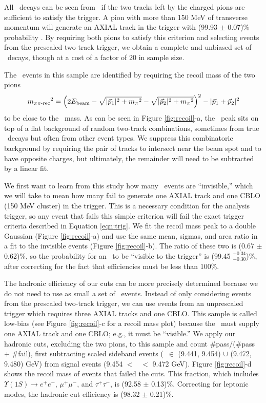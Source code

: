 \documentclass[aps,prd,preprint,superscriptaddress,tightenlines,nofootinbib,floatfix]{revtex4}
\begin{document}
All \uone\ decays can be seen from \twotoone\ if the two tracks left
by the charged pions are sufficient to satisfy the trigger.  A pion
with more than 150 MeV of transverse momentum will generate an AXIAL
track in the trigger with (99.93 $\pm$ 0.07)\% probability
\cite{inga}.  By requiring both pions to satisfy this criterion and
selecting events from the prescaled two-track trigger, we obtain a
complete and unbiased set of \uone\ decays, though at a cost of a
factor of 20 in sample size.

The \twotoone\ events in this sample are identified by requiring the
recoil mass of the two pions
\begin{equation}
  {m_{\mbox{\scriptsize $\pi\pi$-rec}}}^2 = \left(2 E_{\mbox{\scriptsize beam}} - \sqrt{|\vec{p}_1|^2 + {m_\pi}^2}
  - \sqrt{|\vec{p}_2|^2 + {m_\pi}^2}\right)^2 - |\vec{p}_1 + \vec{p}_2|^2
\end{equation}
to be close to the \uone\ mass.  As can be seen in Figure
\ref{fig:recoil}-a, the \uone\ peak sits on top of a flat background
of random two-track combinations, sometimes from true \twotoone\
decays but often from other event types.  We suppress this
combinatoric background by requiring the pair of tracks to intersect
near the beam spot and to have opposite charges, but ultimately, the
remainder will need to be subtracted by a linear fit.

We first want to learn from this study how many \uone\ events are
``invisible,'' which we will take to mean how many fail to generate
one AXIAL track and one CBLO (150 MeV cluster) in the trigger.  This
is a necessary condition for the analysis trigger, so any event that
fails this simple criterion will fail the exact trigger criteria
described in Equation \ref{eqn:trig}.  We fit the recoil mass peak to
a double Gaussian (Figure \ref{fig:recoil}-a) and use the same mean,
sigmas, and area ratio in a fit to the invisible events (Figure
\ref{fig:recoil}-b).  The ratio of these two is (0.67 $\pm$ 0.62)\%,
so the probability for an \uone\ to be ``visible to the trigger'' is
(99.45 $^{+0.34}_{-0.30}$)\%, after correcting for the fact that
efficiencies must be less than 100\%.

The hadronic efficiency of our cuts can be more precisely determined
because we do not need to use as small a set of \twotoone\ events.
Instead of only considering events from the prescaled two-track
trigger, we can use events from an unprescaled trigger which requires
three AXIAL tracks and one CBLO.  This sample is called low-bias (see
Figure \ref{fig:recoil}-c for a recoil mass plot) because the \uone\
must supply one AXIAL track and one CBLO; e.g., it must be
``visible.''  We apply our hadronic cuts, excluding the two pions, to
this sample and count \#pass/(\#pass $+$ \#fail), first subtracting
scaled sideband events (\mpprec\ $\in$ (9.441, 9.454) $\cup$ (9.472,
9.480) GeV) from signal events (9.454 $<$ \mpprec\ $<$ 9.472 GeV).
Figure \ref{fig:recoil}-d shows the recoil mass of events that failed
the cuts.  This fraction, which includes $\Upsilon(1S) \to e^+e^-$,
$\mu^+\mu^-$, and $\tau^+\tau^-$, is (92.58 $\pm$ 0.13)\%.  Correcting
for leptonic modes, the hadronic cut efficiency is (98.32 $\pm$
0.21)\%.
\end{document}
